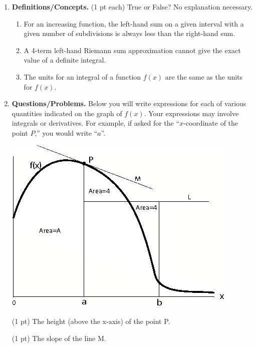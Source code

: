 \documentclass[11pt,letterpaper]{article}
\begin{document}
\begin{enumerate}
\item \textbf{Definitions/Concepts.} (1 pt each) True or False?  No explanation necessary.
\begin{enumerate}
 \item For an increasing function, the left-hand sum on a given interval with a given number of subdivisions is always less than the right-hand sum.

\vspace{1pc}
\item A 4-term left-hand Riemann sum approximation cannot give the exact value of a definite integral.

\vspace{1pc}
\item The units for an integral of a function $f(x)$ are the same as the units for $f(x)$.
\end{enumerate}

\vspace{2pc}
\item \textbf{Questions/Problems.}  
\noindent Below you will write expressions for
each of various quantities indicated on the graph of
$f(x)$. Your
expressions may involve integrals or derivatives. For
example, if
asked for the ``$x$-coordinate of the point $P$,'' you
would write
``$a$''.

\begin{center}
 \includegraphics[scale=.8]{./q10.jpeg}
\end{center}

 (1 pt) The height (above the x-axis) of the
point P.

\vspace{1.0in}
 (1 pt)  The slope of the line M.



\end{enumerate}
\end{document}
